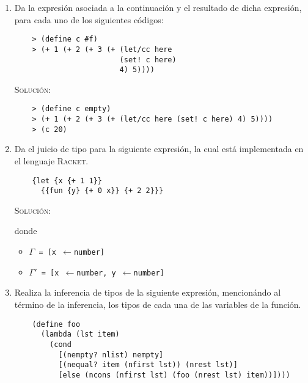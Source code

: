 \documentclass[letterpaper,11pt]{article}
\begin{document}
\begin{enumerate}
    \item Da la expresión asociada a la continuación y el resultado de dicha 
    expresión, para cada uno de los siguientes códigos:
    \begin{verbatim}
    > (define c #f)
    > (+ 1 (+ 2 (+ 3 (+ (let/cc here 
                        (set! c here)
                        4) 5))))
    \end{verbatim}

    \textsc{Solución:}

    \begin{verbatim}
    > (define c empty)
    > (+ 1 (+ 2 (+ 3 (+ (let/cc here (set! c here) 4) 5))))
    > (c 20)
    \end{verbatim}

    \item Da el juicio de tipo para la siguiente expresión, la cual está 
    implementada en el lenguaje \textsc{Racket}.
    \begin{verbatim}
    {let {x {+ 1 1}}
      {{fun {y} {+ 0 x}} {+ 2 2}}}
    \end{verbatim}

    \textsc{Solución:} 
    \begin{prooftree}
    \end{prooftree}

    donde 
    \begin{itemize}
        \item \texttt{$\Gamma$ = [x $\leftarrow$number]}
        \item \texttt{$\Gamma'$ = [x $\leftarrow$number, 
        y $\leftarrow$number]}
    \end{itemize}

    \item Realiza la inferencia de tipos de la siguiente expresión, mencionándo
    al término de la inferencia, los tipos de cada una de las variables de la 
    función.
    \begin{verbatim}
    (define foo 
      (lambda (lst item)
        (cond 
          [(nempty? nlist) nempty]
          [(nequal? item (nfirst lst)) (nrest lst)]
          [else (ncons (nfirst lst) (foo (nrest lst) item))])))
    \end{verbatim}


\end{enumerate}
\end{document}
